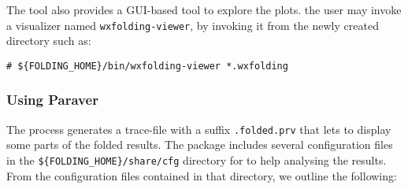 

The tool also provides a GUI-based tool to explore the plots. 
the user may invoke a visualizer named \texttt{wxfolding-viewer}, by invoking it from the newly created directory such as:

\begin{verbatim}
# ${FOLDING_HOME}/bin/wxfolding-viewer *.wxfolding
\end{verbatim}

\subsubsection{Using Paraver}

The \FOLDING process generates a trace-file with a suffix \texttt{.folded.prv} that lets \PARAVER to display some parts of the folded results.
The \FOLDING package includes several configuration files in the \texttt{\$\{FOLDING\_HOME\}/share/cfg} directory for \PARAVER to help analysing the results.
From the configuration files contained in that directory, we outline the following:

